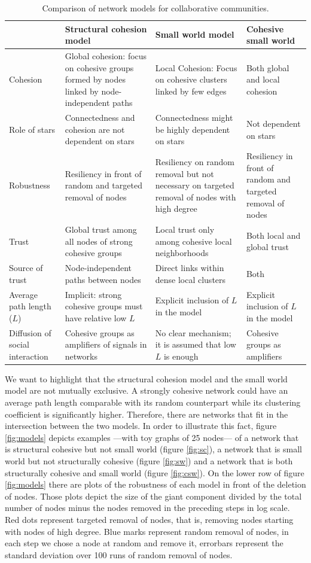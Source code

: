 \begin{table}[h]
\begin{tabular}{|p{2.5cm}|p{4.5cm}|p{4.5cm}|p{4cm}|}
\hline
&Structural cohesion model&Small world model& Cohesive small world\\
\hline
Cohesion&Global cohesion: focus on cohesive groups formed by nodes linked by node-independent paths&Local Cohesion: Focus on cohesive clusters linked by few edges&Both global and local cohesion\\
\hline
Role of stars&Connectedness and cohesion are not dependent on stars&Connectedness might be highly dependent on stars&Not dependent on stars\\
\hline
Robustness&Resiliency in front of random and targeted removal of nodes&Resiliency on random removal but not necessary on targeted removal of nodes with high degree&Resiliency in front of random and targeted removal of nodes\\
\hline
Trust&Global trust among all nodes of strong cohesive groups&Local trust only among cohesive local neighborhoods& Both local and global trust\\
\hline
Source of trust&Node-independent paths between nodes&Direct links within dense local clusters& Both\\
\hline
Average path length ($L$)&Implicit: strong cohesive groups must have relative low $L$&Explicit inclusion of $L$ in the model&Explicit inclusion of $L$ in the model\\
\hline
Diffusion of social interaction&Cohesive groups as amplifiers of signals in networks&No clear mechanism; it is assumed that low $L$ is enough&Cohesive groups as amplifiers\\
\hline
\end{tabular}
\caption{Comparison of network models for collaborative communities.}
\label{t:models}
\end{table}

We want to highlight that the structural cohesion model and the small world model are not mutually exclusive. A strongly cohesive network could have an average path length comparable with its random counterpart while its clustering coefficient is significantly higher. Therefore, there are networks that fit in the intersection between the two models. In order to illustrate this fact, figure \ref{fig:models} depicts examples ---with toy graphs of 25 nodes--- of a network that is structural cohesive but not small world (figure \ref{fig:sc}), a network that is small world but not structurally cohesive (figure \ref{fig:sw}) and a network that is both structurally cohesive and small world (figure \ref{fig:csw}). On the lower row of figure \ref{fig:models} there are plots of the robustness of each model in front of the deletion of nodes. Those plots depict the size of the giant component divided by the total number of nodes minus the nodes removed in the preceding steps in log scale. Red dots represent targeted removal of nodes, that is, removing nodes starting with nodes of high degree. Blue marks represent random removal of nodes, in each step we chose a node at random and remove it, errorbars represent the standard deviation over 100 runs of random removal of nodes.

